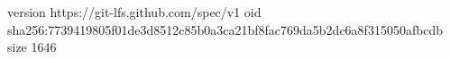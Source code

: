 version https://git-lfs.github.com/spec/v1
oid sha256:7739419805f01de3d8512c85b0a3ca21bf8fac769da5b2dc6a8f315050afbcdb
size 1646
